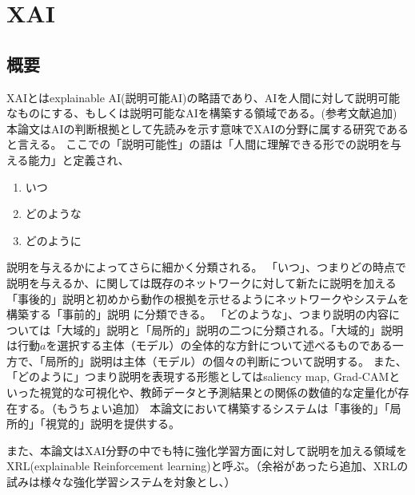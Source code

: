 \section{XAI}

\subsection{概要}
XAIとはexplainable AI(説明可能AI)の略語であり、AIを人間に対して説明可能なものにする、もしくは説明可能なAIを構築する領域である。(参考文献追加)
本論文はAIの判断根拠として先読みを示す意味でXAIの分野に属する研究であると言える。
ここでの「説明可能性」の語は「人間に理解できる形での説明を与える能力」\cite{definition}と定義され、
\begin{enumerate}
    \item いつ
    \item どのような
    \item どのように
\end{enumerate}
説明を与えるかによってさらに細かく分類される。
「いつ」、つまりどの時点で説明を与えるか、に関しては既存のネットワークに対して新たに説明を加える「事後的」説明と初めから動作の根拠を示せるようにネットワークやシステムを構築する「事前的」説明
に分類できる\cite{definition}。
「どのような」、つまり説明の内容については「大域的」説明と「局所的」説明の二つに分類される。「大域的」説明は行動$a$を選択する主体（モデル）の全体的な方針について述べるものである一方で、「局所的」説明は主体（モデル）の個々の判断について説明する\cite{gl}。
また、「どのように」つまり説明を表現する形態としてはsaliency map\cite{saliency}, Grad-CAM\cite{Grad-CAM}といった視覚的な可視化や、教師データと予測結果との関係の数値的な定量化\cite{定量}が存在する。（もうちょい追加）
本論文において構築するシステムは「事後的」「局所的」「視覚的」説明を提供する。

また、本論文はXAI分野の中でも特に強化学習方面に対して説明を加える領域をXRL(explainable Reinforcement learning)と呼ぶ。（余裕があったら追加、XRLの試みは様々な強化学習システムを対象とし、）

